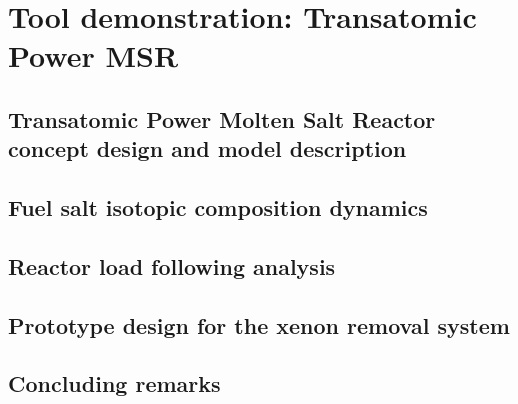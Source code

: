 \chapter{Tool demonstration: Transatomic Power MSR}

\section{Transatomic Power Molten Salt Reactor concept design and model 
description}

\section{Fuel salt isotopic composition dynamics}

\section{Reactor load following analysis}

\section{Prototype design for the xenon removal system}

\section{Concluding remarks}
